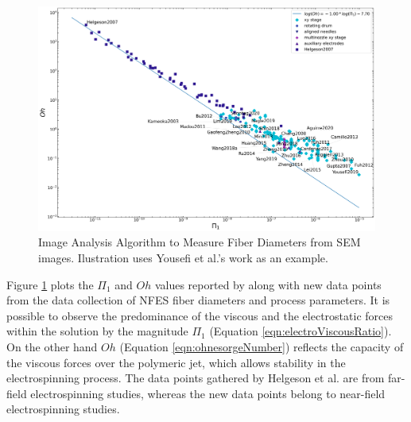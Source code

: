 \begin{figure}[!th]
\centering
\includegraphics[width=\textwidth]{./Figures/plt_Pi1_vs_Oh.png}
\decoRule
\caption[Image Analysis Algorithm to Measure Fiber Diameters from SEM images]{Image Analysis Algorithm to Measure Fiber Diameters from SEM images. Ilustration uses Yousefi et al.'s work as an example. \cite{Helgeson2007,
  Yang2019,Fattahi2017,Shin2019,Wang2015,Parajuli2016,Zheng2010,Fuh2011,Dalton2015,
  Ru2014,Xue2014,Wang2017,Xu2014,Liu2013,Pan2014,Canton2014,Chakraborty2009,Gupta2007,
  He2018,Zhou2011,Chen2013,Williams2018,Choi2017,Pan2019,Lei2015,Lim2019,Park2020,
  Fuh2012,Flores2017,Chang2010,Xu2019,Zhang2019,Shin2018,Fuh2015,Nagle2019,Zheng2012,
  Kameoka2003a,Liu2014,E.King2019,Hochleitner2017,Madou2011,Jiang2018,Husain2016,
  ElectrospinTech2015,Brown2011,Kolan2018,Chang2011,Beachley2011,Camillo2013,Kameoka2003,
  Bu2012,Lee2012,Huang2015,Coppola2020,CisquellaSerra2019,Ruggieri2013,Hochleitner2014,
  Zhu2016,Brown2014,Chang2008,Sonntag2020,Kim2018,Deng2020,Han2019,George2020,Sun2006a,
  Pan2015,Shen2016,Strauss2019,Fuh2013,Sarkar2007,You2017,Wang2018a,Zheng2014,Song2015,
  GaofengZheng2010,Liu2015a,Min2013,Luo2016,Yousefi2019,Cardenas2017,Coppola2014}}
\label{fig:plt_Pi1_vs_Oh}
\end{figure}

Figure \ref{fig:plt_Pi1_vs_Oh} plots the $\Pi_1$ and $Oh$ values reported by \cite{Helgeson2007} along with new data points from the data collection of NFES fiber diameters and process parameters. It is possible to observe the predominance of the viscous and the electrostatic forces within the solution by the magnitude $\Pi_1$ (Equation \ref{eqn:electroViscousRatio}). On the other hand $Oh$ (Equation \ref{eqn:ohnesorgeNumber}) reflects the capacity of the viscous forces over the polymeric jet, which allows stability in the electrospinning process. The data points gathered by Helgeson et al. are from far-field electrospinning studies, whereas the new data points belong to near-field electrospinning studies.

